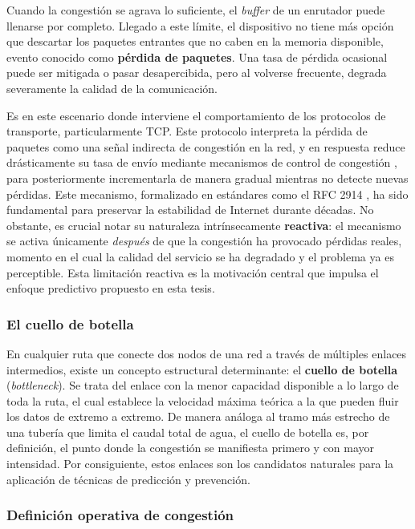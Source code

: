 \documentclass[12pt]{report}
\begin{document}
Cuando la congestión se agrava lo suficiente, el \textit{buffer} de un enrutador puede llenarse por completo. Llegado a este límite, el dispositivo no tiene más opción que descartar los paquetes entrantes que no caben en la memoria disponible, evento conocido como \textbf{pérdida de paquetes}. Una tasa de pérdida ocasional puede ser mitigada o pasar desapercibida, pero al volverse 
frecuente, degrada severamente la calidad de la comunicación.

Es en este escenario donde interviene el comportamiento de los protocolos de transporte, particularmente TCP. Este protocolo interpreta la pérdida de paquetes como una señal indirecta de congestión en la red, y en respuesta reduce drásticamente su tasa de envío mediante mecanismos de control de congestión \cite{jacobson1988}, para posteriormente incrementarla de manera gradual mientras 
no detecte nuevas pérdidas. Este mecanismo, formalizado en estándares como el RFC 2914 \cite{rfc2914}, ha sido fundamental para preservar la estabilidad de Internet durante décadas. No obstante, es crucial notar su naturaleza intrínsecamente \textbf{reactiva}: el mecanismo se activa únicamente \textit{después} de que la congestión ha provocado pérdidas reales, momento en el cual la calidad 
del servicio se ha degradado y el problema ya es perceptible. Esta limitación reactiva es la motivación central que impulsa el enfoque predictivo propuesto en esta tesis.

\subsubsection*{El cuello de botella}

En cualquier ruta que conecte dos nodos de una red a través de múltiples enlaces intermedios, existe un concepto estructural determinante: el \textbf{cuello de botella} (\textit{bottleneck}). Se trata del enlace con la menor capacidad disponible a lo largo de toda la ruta, el cual establece la velocidad máxima teórica a la que pueden fluir los datos de extremo a extremo. De manera análoga 
al tramo más estrecho de una tubería que limita el caudal total de agua, el cuello de botella es, por definición, el punto donde la congestión se manifiesta primero y con mayor intensidad. Por consiguiente, estos enlaces son los candidatos naturales para la aplicación de técnicas de predicción y prevención.

\subsubsection*{Definición operativa de congestión}
\end{document}
